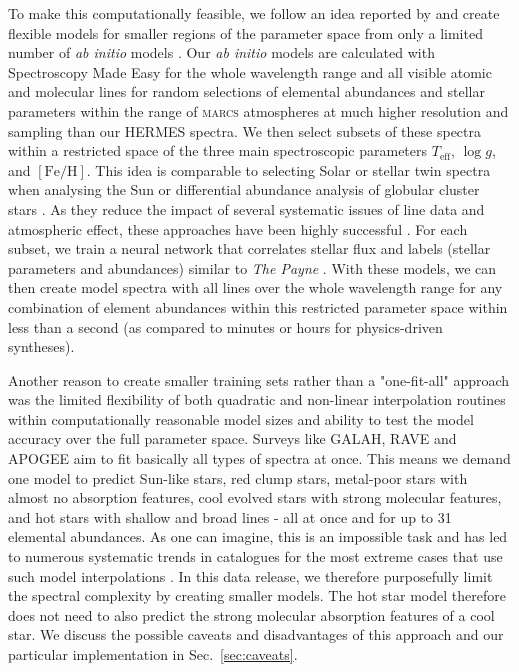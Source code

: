 \documentclass[
  journal=pasa,
  manuscript=research-paper, %
  year=2024,
  volume=37
]{cup-journal}
\newcommand{\Teff}{$T_\mathrm{eff}$\xspace}
\newcommand{\logg}{$\log g$\xspace}
\newcommand{\feh}{$\mathrm{[Fe/H]}$\xspace}
\newcommand{\sme}{\textsc{sme}\xspace}
\newcommand{\marcs}{\textsc{marcs}\xspace}
\begin{document}
To make this computationally feasible, we follow an idea reported by \citet{Rix2016} and create flexible models for smaller regions of the parameter space from only a limited number of \textit{ab initio} models \citep[see also][]{Ting2016b}. Our \textit{ab initio} models are calculated with Spectroscopy Made Easy \citep[\sme][]{Valenti1996,Piskunov2017} for the whole wavelength range and all visible atomic and molecular lines for random selections of elemental abundances and stellar parameters within the range of \marcs atmospheres \citep{Gustafsson2008} at much higher resolution and sampling than our HERMES spectra. We then select subsets of these spectra within a restricted space of the three main spectroscopic parameters \Teff, \logg, and \feh. This idea is comparable to selecting Solar or stellar twin spectra when analysing the Sun \citep[see e.g.]{Nissen2015} or differential abundance analysis of globular cluster stars \citep[e.g.]{Yong2013, Monty2023}. As they reduce the impact of several systematic issues of line data and atmospheric effect, these approaches have been highly successful \citep{Nissen2018}. For each subset, we train a neural network that correlates stellar flux and labels (stellar parameters and abundances) similar to \textit{The Payne} \citep{Ting2019}. With these models, we can then create model spectra with all lines over the whole wavelength range for any combination of element abundances within this restricted parameter space within less than a second (as compared to minutes or hours for physics-driven syntheses). 

Another reason to create smaller training sets rather than a "one-fit-all" approach was the limited flexibility of both quadratic and non-linear interpolation routines within computationally reasonable model sizes and ability to test the model accuracy over the full parameter space. Surveys like GALAH, RAVE and APOGEE aim to fit basically all types of spectra at once. This means we demand one model to predict Sun-like stars, red clump stars, metal-poor stars with almost no absorption features, cool evolved stars with strong molecular features, and hot stars with shallow and broad lines - all at once and for up to 31 elemental abundances. As one can imagine, this is an impossible task and has led to numerous systematic trends in catalogues for the most extreme cases that use such model interpolations \citep{Casey2016,Buder2018,Ting2019}. In this data release, we therefore purposefully limit the spectral complexity by creating smaller models. The hot star model therefore does not need to also predict the strong molecular absorption features of a cool star. We discuss the possible caveats and disadvantages of this approach and our particular implementation in Sec.~\ref{sec:caveats}.
\end{document}
